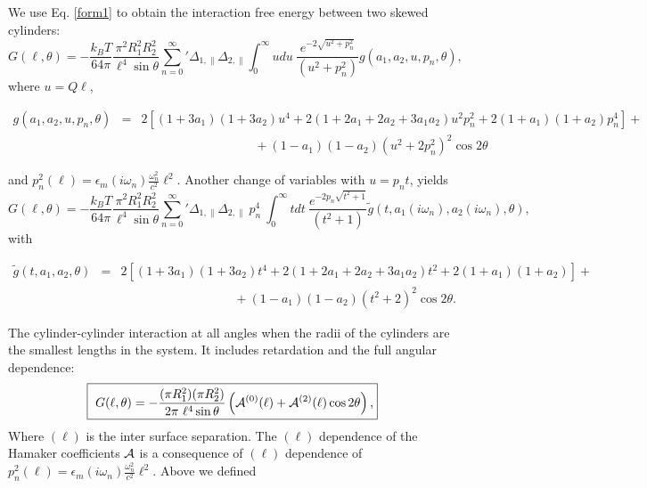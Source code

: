\documentclass[onecolumn,letterpaper,amsmath,amssymb,floatfix,aps,superscriptaddress]{revtex4}
\begin{document}
We use  Eq. \ref{form1} to obtain the interaction free energy between two skewed cylinders:
\begin{equation}
G(\ell,\theta) = - \frac{k_BT}{64 \pi} \frac{ \pi^2 R_1^{2} R_2^{2} }{\ell^{4} \sin{\theta}} {\sum_{n=0}^{\infty}}' \Delta_{1,\parallel} \Delta_{2,\parallel} \int_0^{\infty}  u du ~\frac{e^{- 2 \sqrt{u^{2} + p_n^{2}}}}{(u^{2} + p_n^{2})}  g(a_1, a_2, u, p_n, \theta),
\label{pars-3}
\end{equation}
where $u = Q \ell$,  
\begin{widetext}
\begin{eqnarray}
g(a_1, a_2, u, p_n, \theta) &=&  2 \left[ (1+3a_1)(1+3a_2) u^{4} + 2(1+2a_1+2a_2+3a_1a_2) u^{2}p_n^{2}  + 2(1+a_1)(1+a_2) p_n^{4}\right] + \nonumber \\ 
& & ~~~~~~~~~~~~~~~~~~~~~~~~~~~~~~~~~~~~~~~~~ + (1-a_1)(1-a_2)(u^{2} + 2 p_n^{2})^2 \cos 2\theta
\end{eqnarray}
\end{widetext}
and $p_n^{2}(\ell) =  \epsilon_m(i \omega_n) \frac{\omega_n^{2}}{c^{2}} \ell^{2}$. Another change of variables with $u = p_n t$, yields 
\begin{equation}
G(\ell,\theta) = - \frac{k_BT}{64 \pi} \frac{ \pi^2 R_1^{2} R_2^{2} }{\ell^{4} \sin{\theta}} {\sum_{n=0}^{\infty}}' \Delta_{1,\parallel} \Delta_{2,\parallel} ~p_n^{4} ~\int_0^{\infty} t dt ~\frac{e^{- 2 p_n \sqrt{t^{2} + 1}}}{(t^{2} + 1)} \tilde g(t, a_1(i \omega_n), a_2(i \omega_n), \theta),
\label{pars-31}
\end{equation}
with
\begin{widetext}
\begin{eqnarray}
\tilde g(t, a_1, a_2, \theta) &=& 2 \left[ (1+3a_1)(1+3a_2) t^{4} + 2 (1+2a_1+2a_2+3a_1a_2) t^{2}  + 2(1+a_1)(1+a_2)\right] + \nonumber \\
& & ~~~~~~~~~~~~~~~~~~~~~~~~~~~~~~~~~~~~~~~~~ + (1-a_1)(1-a_2)(t^{2} + 2)^2 \cos 2\theta.
\label{pars-31-g}
\end{eqnarray}
\end{widetext}
The cylinder-cylinder interaction at all angles when the radii of the cylinders are the smallest lengths in the system. It includes retardation and the full angular dependence:
\begin{equation}
  \fbox{
    $\displaystyle{
G(\ell,\theta) = - \frac{ (\pi R_1^{2})(\pi R_2^{2}) }{2 \pi~\ell^{4} \sin{\theta}} \left( {\cal A}^{(0)}(\ell) + {\cal A}^{(2)}(\ell) \cos 2\theta \right) ,}$}
\label{pars-31a}
\end{equation}
Where $(\ell)$  is the inter surface separation. The $(\ell)$ dependence of the Hamaker coefficients $\cal A$ is a consequence of $(\ell)$ dependence of $p_n^{2}(\ell) =  \epsilon_m(i \omega_n) \frac{\omega_n^{2}}{c^{2}} \ell^{2}$. Above we defined
\end{document}
